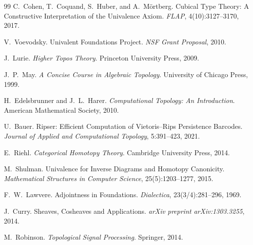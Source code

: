 \documentclass[11pt,a4paper]{article}
\theoremstyle{plain}
\theoremstyle{definition}
\begin{document}
\begin{thebibliography}{99}
C.~Cohen, T.~Coquand, S.~Huber, and A.~M\"ortberg.
Cubical Type Theory: A Constructive Interpretation of the Univalence Axiom.
\textit{FLAP}, 4(10):3127--3170, 2017.

V.~Voevodsky.
Univalent Foundations Project.
\textit{NSF Grant Proposal}, 2010.

J.~Lurie.
\textit{Higher Topos Theory}.
Princeton University Press, 2009.

J.~P.~May.
\textit{A Concise Course in Algebraic Topology}.
University of Chicago Press, 1999.

H.~Edelsbrunner and J.~L.~Harer.
\textit{Computational Topology: An Introduction}.
American Mathematical Society, 2010.

U.~Bauer.
Ripser: Efficient Computation of Vietoris--Rips Persistence Barcodes.
\textit{Journal of Applied and Computational Topology}, 5:391--423, 2021.

E.~Riehl.
\textit{Categorical Homotopy Theory}.
Cambridge University Press, 2014.

M.~Shulman.
Univalence for Inverse Diagrams and Homotopy Canonicity.
\textit{Mathematical Structures in Computer Science}, 25(5):1203--1277, 2015.

F.~W.~Lawvere.
Adjointness in Foundations.
\textit{Dialectica}, 23(3/4):281--296, 1969.

J.~Curry.
Sheaves, Cosheaves and Applications.
\textit{arXiv preprint arXiv:1303.3255}, 2014.

M.~Robinson.
\textit{Topological Signal Processing}.
Springer, 2014.

\end{thebibliography}
\end{document}
